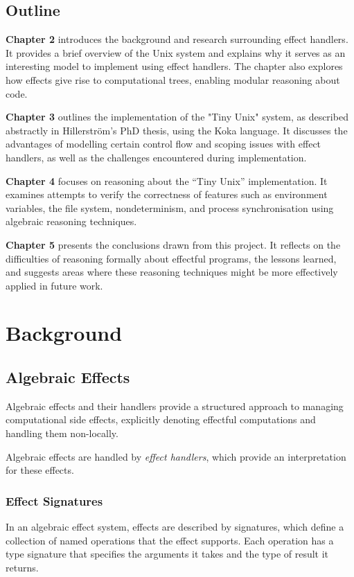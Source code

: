\documentclass[logo,bsc,singlespacing,parskip]{infthesis}
\begin{document}
\section{Outline}

\textbf{Chapter 2} introduces the background and research surrounding effect handlers. It provides a brief overview of the Unix system and explains why it serves as an interesting model to implement using effect handlers. The chapter also explores how effects give rise to computational trees, enabling modular reasoning about code.

\textbf{Chapter 3} outlines the implementation of the "Tiny Unix" system, as described abstractly in Hillerström's PhD thesis, using the Koka language. It discusses the advantages of modelling certain control flow and scoping issues with effect handlers, as well as the challenges encountered during implementation.

\textbf{Chapter 4} focuses on reasoning about the “Tiny Unix” implementation. It examines attempts to verify the correctness of features such as environment variables, the file system, nondeterminism, and process synchronisation using algebraic reasoning techniques.

\textbf{Chapter 5} presents the conclusions drawn from this project. It reflects on the difficulties of reasoning formally about effectful programs, the lessons learned, and suggests areas where these reasoning techniques might be more effectively applied in future work.


\chapter{Background}

\section{Algebraic Effects}

Algebraic effects \cite{plotkin_handling_2013} and their handlers \cite{pretnar_introduction_2015} provide a structured approach to managing computational side effects, explicitly denoting effectful computations and handling them non-locally.

Algebraic effects are handled by \textit{effect handlers}, which provide an interpretation for these effects.

\subsection{Effect Signatures}
In an algebraic effect system, effects are described by signatures, which define a collection of named operations that the effect supports. Each operation has a type signature that specifies the arguments it takes and the type of result it returns.
\end{document}
